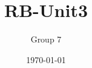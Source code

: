 \documentclass[a4paper,12pt]{article}
\title{RB-Unit3}
\author{Group 7}
\date{\today}
\begin{document}
\raggedright
\maketitle





\end{document}
